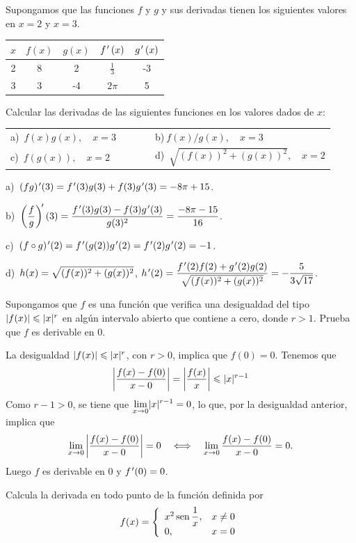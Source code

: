 \begin{ejercicios resueltos}
\resuelto Supongamos que las funciones $f$ y $g$ y sus derivadas
tienen los siguientes valores en $x=2$ y $x=3$.
\begin{center}
\begin{tabular}{|c|c|c||c|c|}
\hline 
$x$ &
$f\left(x\right)$ &
$g\left(x\right)$ &
$f\tl\left(x\right)$ &
$g\tl\left(x\right)$\tabularnewline
\hline 
\hline 
2 &
8 &
2 &
$\frac{1}{3}$ &
-3\tabularnewline
\hline 
3 &
3 &
-4 &
$2\pi$ &
5\tabularnewline
\hline 
\end{tabular}
\par\end{center}

Calcular las derivadas de las siguientes funciones en los valores
dados de $x$:

\begin{tabular}{ll}
a)\ $f(x)g(x),\quad x=3\qquad\quad$  &
b)$\ f(x)/g(x),\quad x=3$\tabularnewline
c)\ $f(g(x)),\quad x=2$  &
d)\ $\sqrt{(f(x))^{2}+(g(x))^{2}},\quad x=2$ \tabularnewline
\end{tabular}

\sol a)\ $(fg)\tl(3)=f\tl(3)g(3)+f(3)g\tl(3)=-8\pi+15$.

b)\ $\left(\dfrac{f}{g}\right)^{\!\prime}(3)=\dfrac{f\tl(3)g(3)-f(3)g\tl(3)}{g(3)^{2}}=\dfrac{-8\pi-15}{16}$.

c)\ $(f\circ g)\tl(2)=f\tl(g(2))g\tl(2)=f\tl(2)g\tl(2)=-1$.

d)\ $h(x)=\dis\sqrt{(f(x))^{2}+(g(x))^{2}}$, $h\tl(2)=\dfrac{f\tl(2)f(2)+g\tl(2)g(2)}{\sqrt{(f(x))^{2}+(g(x))^{2}}}=-\dfrac{5}{3\sqrt{17}}$.\hecho

\resuelto Supongamos que $f$ es una función que verifica una desigualdad
del tipo $\abs{f(x)}\le\abs{x}^{r}$ en algún intervalo abierto que
contiene a cero, donde $r>1$. Prueba que $f$ es derivable en $0$.

\sol La desigualdad $\abs{f(x)}\le\abs{x}^{r}$, con $r>0$, implica
que $f(0)=0$. Tenemos que 
\[
\modulo{\dfrac{f(x)-f(0)}{x-0}}=\modulo{\dfrac{f(x)}{x}}\le\abs{x}^{r-1}
\]
Como $r-1>0$, se tiene que $\Lim{\abs{x}^{r-1}}{x}{0}=0$, lo que,
por la desigualdad anterior, implica que 
\[
\lim_{x\to0}\modulo{\dfrac{f(x)-f(0)}{x-0}}=0\quad\Longleftrightarrow\quad\lim_{x\to0}\dfrac{f(x)-f(0)}{x-0}=0.
\]
Luego $f$ es derivable en $0$ y $f\tl(0)=0$.

\resuelto Calcula la derivada en todo punto de la función definida
por 
\[
f(x)=\left\{ \begin{array}{ll}
x^{2}\sen\dfrac{1}{x}, & x\neq0\\
0, & x=0
\end{array}\right.
\]


\end{ejercicios resueltos}
